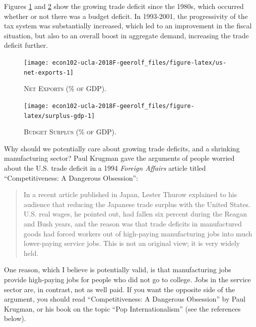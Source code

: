\documentclass[]{book}
\begin{document}
Figures \ref{fig:us-net-exports} and \ref{fig:surplus-gdp} show the
growing trade deficit since the 1980s, which occurred whether or not
there was a budget deficit. In 1993-2001, the progressivity of the tax
system was substantially increased, which led to an improvement in the
fiscal situation, but also to an overall boost in aggregate demand,
increasing the trade deficit further.



\begin{figure}

{\centering \texttt{[image: econ102-ucla-2018F-geerolf\_files/figure-latex/us-net-exports-1]} 

}

\caption{\textsc{Net Exports (\% of GDP)}.}\label{fig:us-net-exports}
\end{figure}



\begin{figure}

{\centering \texttt{[image: econ102-ucla-2018F-geerolf\_files/figure-latex/surplus-gdp-1]} 

}

\caption{\textsc{Budget Surplus (\% of GDP).}}\label{fig:surplus-gdp}
\end{figure}

Why should we potentially care about growing trade deficits, and a
shrinking manufacturing sector? Paul Krugman gave the arguments of
people worried about the U.S. trade deficit in a 1994 \emph{Foreign
Affairs} article titled ``Competitiveness: A Dangerous Obsession'':

\begin{quote}
In a recent article published in Japan, Lester Thurow explained to his
audience that reducing the Japanese trade surplus with the United
States. U.S. real wages, he pointed out, had fallen six percent during
the Reagan and Bush years, and the reason was that trade deficits in
manufactured goods had forced workers out of high-paying manufacturing
jobs into much lower-paying service jobs. This is not an original view;
it is very widely held.
\end{quote}

One reason, which I believe is potentially valid, is that manufacturing
jobs provide high-paying jobs for people who did not go to college. Jobs
in the service sector are, in contrast, not as well paid. If you want
the opposite side of the argument, you should read ``Competitiveness: A
Dangerous Obsession'' by Paul Krugman, or his book on the topic ``Pop
Internationalism'' (see the references below).
\end{document}
